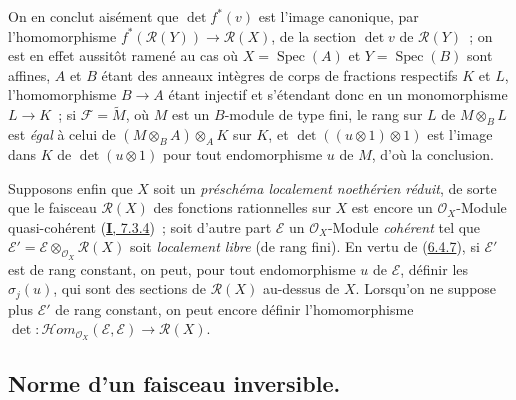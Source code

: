 \begin{env}[6.4.9]
On en conclut aisément que $\det f^*(v)$ est l'image canonique, par
l'homomorphisme $f^*(\mathcal{R}(Y))\to\mathcal{R}(X)$, de la section
$\det v$ de $\mathcal{R}(Y)$~; on est en effet aussitôt ramené au cas où
$X=\operatorname{Spec}(A)$ et $Y=\operatorname{Spec}(B)$ sont affines, $A$ et
$B$ étant des anneaux intègres de corps de fractions respectifs $K$ et $L$,
l'homomorphisme $B\to A$ étant injectif et s'étendant donc en un monomorphisme
$L\to K$~; si $\mathcal{F}=\widetilde{M}$, où $M$ est un $B$-module de type
fini, le rang sur $L$ de $M\otimes_B L$ est \emph{égal} à celui de
$(M\otimes_B A)\otimes_A K$ sur $K$, et $\det((u\otimes1)\otimes1)$ est
l'image dans $K$ de $\det(u\otimes1)$ pour tout endomorphisme $u$ de $M$,
d'où la conclusion.
\end{env}

\begin{env}[6.4.10]
\label{II.6.4.10-fr}
Supposons enfin que $X$ soit un \emph{préschéma localement noethérien réduit},
de sorte que le faisceau $\mathcal{R}(X)$ des fonctions rationnelles sur $X$
est encore un $\mathcal{O}_X$-Module quasi-cohérent
(\hyperref[I.7.3.4-fr]{\textbf{I}, 7.3.4})~; soit d'autre part $\mathcal{E}$ un
$\mathcal{O}_X$-Module \emph{cohérent} tel que
$\mathcal{E}'=\mathcal{E}\otimes_{\mathcal{O}_X}\mathcal{R}(X)$ soit
\emph{localement libre} (de rang fini). En vertu de
(\hyperref[II.6.4.7-fr]{6.4.7}), si $\mathcal{E}'$ est de rang constant, on
peut, pour tout endomorphisme $u$ de $\mathcal{E}$, définir les $\sigma_j(u)$,
qui sont des sections de $\mathcal{R}(X)$ au-dessus de $X$. Lorsqu'on ne
suppose plus $\mathcal{E}'$ de rang constant, on peut encore définir
l'homomorphisme
$\det:\mathcal{H}om_{\mathcal{O}_X}(\mathcal{E},\mathcal{E})
\to\mathcal{R}(X)$.
\end{env}

\subsection{Norme d'un faisceau inversible.}
\label{subsection:II.6.5-fr}

